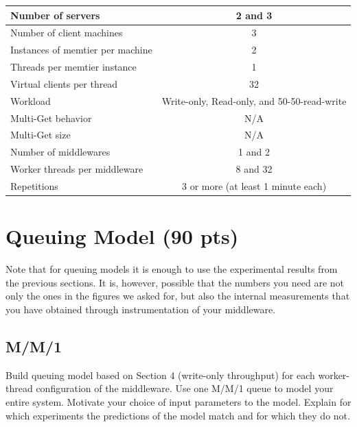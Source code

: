\documentclass[11pt,a4paper]{article}
\begin{document}
\begin{center}
	\scriptsize{
		\begin{tabular}{|l|c|}
			\hline Number of servers                & 2 and 3                                     \\ 
			\hline Number of client machines        & 3                                           \\ 
			\hline Instances of memtier per machine & 2                                           \\ 
			\hline Threads per memtier instance     & 1                                           \\
			\hline Virtual clients per thread       & 32                                     \\ 
			\hline Workload                         & Write-only, Read-only, and 50-50-read-write \\
			\hline Multi-Get behavior               & N/A                                         \\
			\hline Multi-Get size                   & N/A                                         \\
			\hline Number of middlewares            & 1 and 2                                     \\
			\hline Worker threads per middleware    & 8 and 32                                    \\
			\hline Repetitions                      & 3 or more (at least 1 minute each)                                   \\ 
			\hline 
		\end{tabular}
	} 
\end{center}

\section{Queuing Model (90 pts)}

Note that for queuing models it is enough to use the experimental results from the previous sections. It is, however, possible that the numbers you need are not only the ones in the figures we asked for, but also the internal measurements that you have obtained through instrumentation of your middleware.

\subsection{M/M/1}

Build queuing model based on Section 4 (write-only throughput) for each worker-thread configuration of the middleware. Use one M/M/1 queue to model your entire system. Motivate your choice of input parameters to the model. Explain for which experiments the predictions of the model match and for which they do not.
\end{document}
